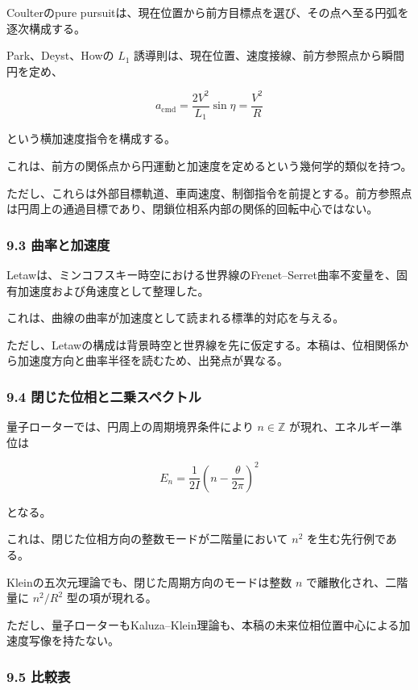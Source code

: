 \documentclass[
  a4paper,
]{ltjsarticle}
\begin{document}
Coulterのpure
pursuitは、現在位置から前方目標点を選び、その点へ至る円弧を逐次構成する。

Park、Deyst、Howの \(L_1\)
誘導則は、現在位置、速度接線、前方参照点から瞬間円を定め、

\[
a_{\mathrm{cmd}}
=\frac{2V^2}{L_1}\sin\eta
=\frac{V^2}{R}
\]

という横加速度指令を構成する。

これは、前方の関係点から円運動と加速度を定めるという幾何学的類似を持つ。

ただし、これらは外部目標軌道、車両速度、制御指令を前提とする。前方参照点は円周上の通過目標であり、閉鎖位相系内部の関係的回転中心ではない。

\subsubsection{9.3
曲率と加速度}\label{ux66f2ux7387ux3068ux52a0ux901fux5ea6}

Letawは、ミンコフスキー時空における世界線のFrenet--Serret曲率不変量を、固有加速度および角速度として整理した。

これは、曲線の曲率が加速度として読まれる標準的対応を与える。

ただし、Letawの構成は背景時空と世界線を先に仮定する。本稿は、位相関係から加速度方向と曲率半径を読むため、出発点が異なる。

\subsubsection{9.4
閉じた位相と二乗スペクトル}\label{ux9589ux3058ux305fux4f4dux76f8ux3068ux4e8cux4e57ux30b9ux30daux30afux30c8ux30eb}

量子ローターでは、円周上の周期境界条件により \(n\in\mathbb Z\)
が現れ、エネルギー準位は

\[
E_n
=\frac{1}{2I}
\left(
n-\frac{\theta}{2\pi}
\right)^2
\]

となる。

これは、閉じた位相方向の整数モードが二階量において \(n^2\)
を生む先行例である。

Kleinの五次元理論でも、閉じた周期方向のモードは整数 \(n\)
で離散化され、二階量に \(n^2/R^2\) 型の項が現れる。

ただし、量子ローターもKaluza--Klein理論も、本稿の未来位相位置中心による加速度写像を持たない。

\subsubsection{9.5 比較表}\label{ux6bd4ux8f03ux8868}
\end{document}
